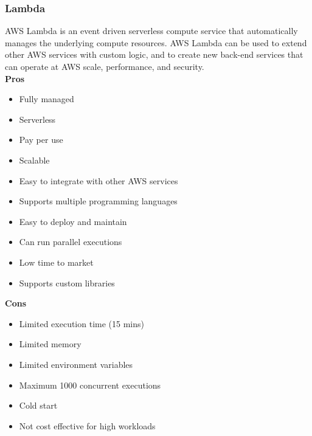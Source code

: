         \subsubsection{Lambda}
        \label{aws:lambda}
        AWS Lambda is an event driven serverless compute service that automatically manages the underlying compute resources.
        AWS Lambda can be used to extend other AWS services with custom logic, and to create new back-end services that can
        operate at AWS scale, performance, and security.\\
        \textbf{Pros}
        \begin{itemize}
            \item Fully managed
            \item Serverless
            \item Pay per use
            \item Scalable
            \item Easy to integrate with other AWS services
            \item Supports multiple programming languages
            \item Easy to deploy and maintain
            \item Can run parallel executions
            \item Low time to market
            \item Supports custom libraries
        \end{itemize}
        \textbf{Cons}
        \begin{itemize}
            \item Limited execution time (15 mins)
            \item Limited memory
            \item Limited environment variables
            \item Maximum 1000 concurrent executions
            \item Cold start
            \item Not cost effective for high workloads
        \end{itemize}


